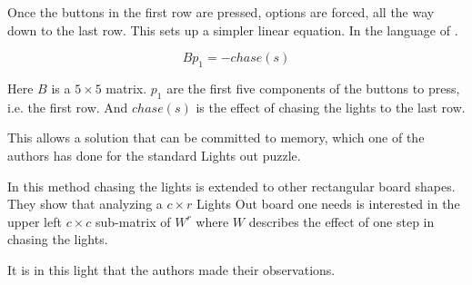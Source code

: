 Once the buttons in the first row are pressed, options are forced, all the way
down to the last row. This sets up a simpler linear equation. In the language of
\cite{martin01}.

\[
Bp_{1}=-chase(s)
\]

Here $B$ is a $5\times 5$ matrix. $p_{1}$ are the first five components of the
buttons to press, i.e. the first row. And $chase(s)$ is the effect of chasing
the lights to the last row.

This allows a solution that can be committed to memory, which one of the authors
has done for the standard Lights out puzzle. 

In \cite{leach17} this method chasing the lights is extended to other
rectangular board shapes. They show that analyzing a $c \times r$ Lights Out
board one needs is interested in the upper left $c \times c$ sub-matrix of
$W^{r}$ where $W$ describes the effect of one step in chasing the lights.

It is in this light that the authors made their observations.
